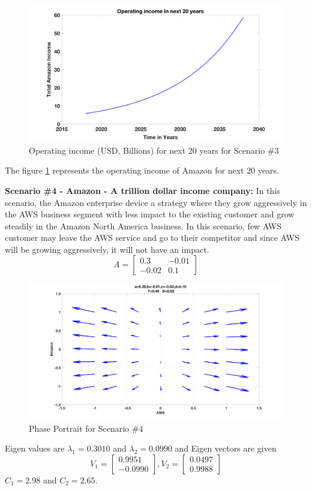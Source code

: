 \documentclass[fleqn,10pt]{SelfArx} %
\begin{document}
\begin{figure}[ht]\centering
\includegraphics[width=\linewidth]{scen3income}
\caption{Operating income (USD, Billions) for next 20 years for Scenario \#3}
\label{fig:scen3income}
\end{figure}

The figure \ref{fig:scen3income} represents the operating income of Amazon for next 20 years. 

\textbf{Scenario \#4 - Amazon - A trillion dollar income company:}
In this scenario, the Amazon enterprise device a strategy where they grow aggressively in the AWS business segment with less impact to the existing customer and grow steadily in the Amazon North America business. In this scenario, few AWS customer may leave the AWS service and go to their competitor and since AWS will be growing aggressively, it will not have an impact.
\[
A =
\begin{bmatrix}
0.3 & -0.01 \\
-0.02 & 0.1
\end{bmatrix}
\]
\begin{figure}[ht]\centering
\includegraphics[width=\linewidth]{scen4}
\caption{Phase Portrait for Scenario \#4}
\label{fig:scen4}
\end{figure}  
Eigen values are $\lambda_1 = 0.3010$ and $\lambda_2 = 0.0990$ and Eigen vectors are given 
\[
V_1 =
\begin{bmatrix}
0.9951  \\
-0.0990 
\end{bmatrix}
,V_2 =
\begin{bmatrix}
0.0497  \\
0.9988
\end{bmatrix}
\]
$C_1=2.98$ and $C_2=2.65$.
\end{document}
